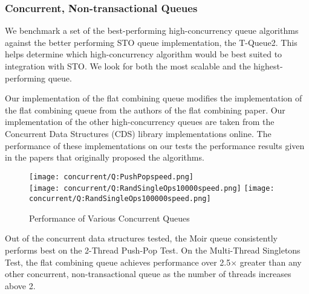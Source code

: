 \subsubsection{Concurrent, Non-transactional Queues}

We benchmark a set of the best-performing high-concurrency queue algorithms against the better performing STO queue implementation, the T-Queue2. This helps determine which high-concurrency algorithm would be best suited to integration with STO. We look for both the most scalable and the highest-performing queue.
 
 Our implementation of the flat combining queue modifies the implementation of the flat combining queue from the authors of the flat combining paper\cite{flatcombining}. Our implementation of the other high-concurrency queues are taken from the Concurrent Data Structures (CDS) library implementations online\cite{libcds}. The performance of these implementations on our tests the performance results given in the papers that originally proposed the algorithms.

\begin{figure}[h!]
\centering
    \texttt{[image: concurrent/Q:PushPopspeed.png]}\\
    \texttt{[image: concurrent/Q:RandSingleOps10000speed.png]}
    \texttt{[image: concurrent/Q:RandSingleOps100000speed.png]}
\caption{Performance of Various Concurrent Queues}
\label{fig:concurrent_queues}
\end{figure}

Out of the concurrent data structures tested, the Moir queue\cite{queue2} consistently performs best on the 2-Thread Push-Pop Test. On the Multi-Thread Singletons Test, the flat combining queue achieves performance over 2.5$\times$ greater than any other concurrent, non-transactional queue as the number of threads increases above 2.

